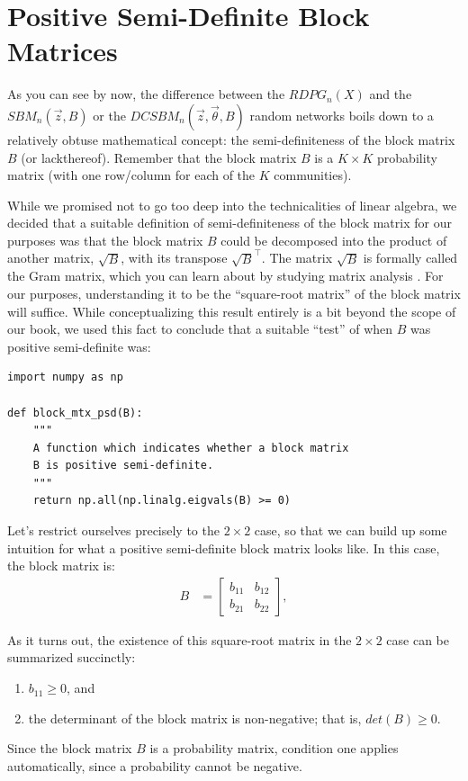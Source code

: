 \section{Positive Semi-Definite Block Matrices}
\label{sec:ch5:psd_block}

As you can see by now, the difference between the $RDPG_n(X)$ and the $SBM_n(\vec z, B)$ or the $DCSBM_n(\vec z, \vec \theta, B)$ random networks boils down to a relatively obtuse mathematical concept: the semi-definiteness of the block matrix $B$ (or lackthereof). Remember that the block matrix $B$ is a $K \times K$ probability matrix (with one row/column for each of the $K$ communities).

While we promised not to go too deep into the technicalities of linear algebra, we decided that a suitable definition of semi-definiteness of the block matrix for our purposes was that the block matrix $B$ could be decomposed into the product of another matrix, $\sqrt B$, with its transpose $\sqrt B^\top$. The matrix $\sqrt B$ is formally called the Gram matrix, which you can learn about by studying matrix analysis \cite{Horn2012Oct}. For our purposes, understanding it to be the ``square-root matrix'' of the block matrix will suffice. While conceptualizing this result entirely is a bit beyond the scope of our book, we used this fact to conclude that a suitable ``test'' of when $B$ was positive semi-definite was:

\begin{lstlisting}[style=python]
import numpy as np

def block_mtx_psd(B):
    """
    A function which indicates whether a block matrix
    B is positive semi-definite.
    """
    return np.all(np.linalg.eigvals(B) >= 0)
\end{lstlisting}

Let's restrict ourselves precisely to the $2 \times 2$ case, so that we can build up some intuition for what a positive semi-definite block matrix looks like. In this case, the block matrix is:
\begin{align*}
    B &= \begin{bmatrix}
        b_{11} & b_{12} \\
        b_{21} & b_{22}
    \end{bmatrix},
\end{align*}

As it turns out, the existence of this square-root matrix in the $2 \times 2$ case can be summarized succinctly:
\begin{enumerate}
    \item $b_{11} \geq 0$, and
    \item the determinant of the block matrix is non-negative; that is, $det(B) \geq 0$.
\end{enumerate}
Since the block matrix $B$ is a probability matrix, condition one applies automatically, since a probability cannot be negative. 

